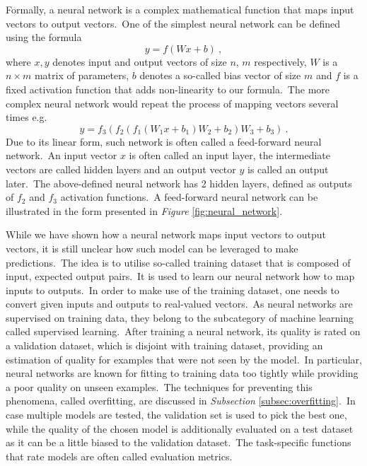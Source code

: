 \documentclass[longabstract, english, mgr]{iithesis}
\theoremstyle{default_theorem_style}\newtheorem{theorem}{Theorem}
\theoremstyle{default_theorem_style}\newtheorem{definition}{Definition}
\begin{document}
\noindent Formally, a neural network is a complex mathematical function that maps input vectors to output
vectors.\ One of the simplest neural network can be defined using the formula
\begin{equation}\label{eq:one_layer_network}
y = f(W x + b)\ ,
\end{equation}
where $x, y$ denotes input and output vectors of size $n$, $m$ respectively, $W$ is a $n \times m$ matrix of
parameters, $b$ denotes a so-called bias vector of size $m$ and $f$ is a fixed activation function that
adds non-linearity to our formula.\ The more complex neural network would repeat the process of mapping vectors several
times e.g.
\begin{equation}\label{eq:multi_layer_network}
y = f_3(f_2(f_1(W_1 x + b_1) W_2 + b_2) W_3 + b_3)\ .
\end{equation}
Due to its linear form, such network is often called a feed-forward neural network.\ An input vector $x$ is often
called an input layer, the intermediate vectors are called hidden layers and an output vector $y$ is called
an output later.\ The above-defined neural network has 2 hidden layers, defined as outputs of $f_2$ and $f_3$
activation functions.\ A feed-forward neural network can be illustrated in the form presented in
\textit{Figure} \ref{fig:neural_network}.\newline

\noindent While we have shown how a neural network maps input vectors to output vectors, it is still unclear how such
model can be leveraged to make predictions.\ The idea is to utilise so-called training dataset that is composed of
input, expected output pairs.\ It is used to learn our neural network how to map inputs to
outputs.\ In order to make use of the training dataset, one needs to convert given inputs and outputs
to real-valued vectors.\ As neural networks are supervised on training data, they belong to the subcategory of machine
learning called supervised learning.\ After training a neural network, its quality is rated on a validation dataset,
which is disjoint with training dataset, providing an estimation of quality for examples that were not seen by the
model.\ In particular, neural networks are known for fitting to training data too tightly while providing a poor
quality on unseen examples.\ The techniques for preventing this phenomena, called overfitting, are discussed in
\textit{Subsection} \ref{subsec:overfitting}.\ In case multiple models are tested, the validation set is used to pick
the best one, while the quality of the chosen model is additionally evaluated on a test dataset as it can be a little
biased to the validation dataset.\ The task-specific functions that rate models are often called
evaluation metrics.\newline
\end{document}
